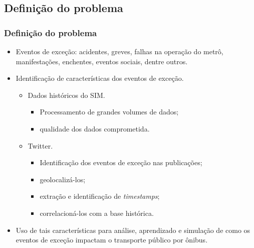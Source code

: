 \documentclass{beamer}
\begin{document}
\subsection{Definição do problema}
\begin{frame}
\frametitle{Definição do problema}
\begin{itemize}
\item Eventos de exceção: acidentes, greves, falhas na operação do metrô, manifestações, enchentes, eventos sociais, dentre outros.
\end{itemize}

\begin{itemize}
\item Identificação de características dos eventos de exceção.
\begin{itemize}
\item Dados históricos do SIM.
\begin{itemize}
\item Processamento de grandes volumes de dados;
\item qualidade dos dados comprometida.
\end{itemize}
\item Twitter.
\begin{itemize}
\item Identificação dos eventos de exceção nas publicações; 
\item geolocalizá-los; 
\item extração e identificação de \textit{timestamps};
\item correlacioná-los com a base histórica.
\end{itemize}
\end{itemize}
\end{itemize}

\begin{itemize}
\item Uso de tais características para análise, aprendizado e simulação de como os eventos de exceção impactam o transporte público por ônibus.
\end{itemize}

\end{frame}
\end{document}
